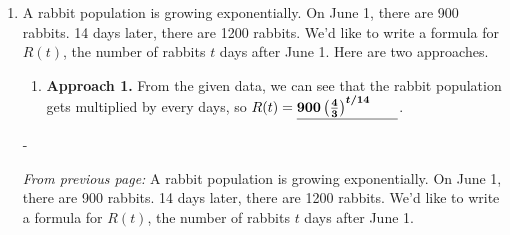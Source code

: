 \documentclass{article}
\makeatletter
\newlength{\tipmargin}
\renewenvironment{framed}{
  \setlength{\tipmargin}{\textwidth-\linewidth}
  \advance\@totalleftmargin-\tipmargin
  \def\FrameCommand{\hspace{\tipmargin}\fbox}%
  \advance\linewidth\tipmargin
  \MakeFramed {\advance\hsize-\width \FrameRestore}%
}
{\endMakeFramed}
\makeatother
\begin{document}
\begin{enumerate}
\begin{enumerate}[start=3]
      \begin{solution}
        When $x$ is a very large positive number, $(\frac{4}{3})^{-x}=(\frac{3}{4})^x$
        is a very small positive
        number, so $\lim\limits _{x \to \infty} 
        \left[5- \left( \frac{4}{3} \right)^{-x}\right]=5$.
      \end{solution}

  \item
    \begin{problem}
      $\displaystyle \lim_{x \to -\infty} 5 - \left( \frac{4}{3} \right)^{-x}$ 
    \end{problem}

    \begin{solution}
        When $x$ is a very large negative number, $(\frac{4}{3})^{-x}$
        is a very large positive
        number, so $\lim\limits _{x \to -\infty} 
        \left[5- \left( \frac{4}{3} \right)^{-x}\right]=-\infty$.
    \end{solution}

  \end{enumerate}
  \probonly{\end{multicols}}

  \pspace{\vfill}

\item 
  A rabbit population is growing exponentially. On June 1, there are 900 rabbits. 14 days later, there are 1200 rabbits. We'd like to write a formula for $R(t)$, the number of rabbits $t$ days after June 1. Here are two approaches.
  \begin{enumerate}
  \item

    \begin{problem}[\nstretch{1.5}]
      \textbf{Approach 1.} From the given data, we can see that the rabbit population gets multiplied by  every  days, so $R(t) =
      \fitb{1in}{900\left(\frac{4}{3}\right)^{t/14}}$. 
    \end{problem}

  \end{enumerate}

  \begin{framed}
    \emph{From previous page:} A rabbit population is growing exponentially. On June 1, there are 900 rabbits. 14 days later, there are 1200 rabbits. We'd like to write a formula for $R(t)$, the number of rabbits $t$ days after June 1.
  \end{framed}


\end{enumerate}
\end{document}
